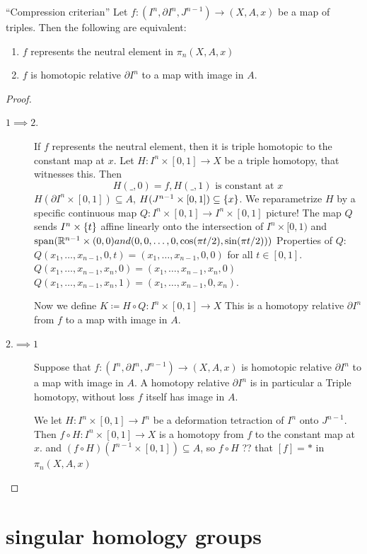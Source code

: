 \documentclass{TemplateLecture}
\begin{document}
\begin{proposition}
    \enquote{Compression criterian} Let \(f \colon (I^n, \partial I^n, J^{n-1}) \to (X,A,x)\) be a map of triples. Then the following are equivalent:
    \begin{enumerate}
        \item \(f\) represents the neutral element in \(\pi_n(X,A,x)\)
        \item \(f\) is homotopic relative \(\partial I^n\) to a map with image in \(A\).
    \end{enumerate}
\end{proposition}
\begin{proof}
    \begin{description}
        \item[\(1 \implies 2.\)]  If \(f\) represents the neutral element, then it is triple homotopic to the constant map at \(x\). Let \(H\colon I^n \times [0,1] \to X\) be a triple homotopy, that witnesses this. Then
        \[H(\_, 0) = f, H(\_, 1) \text{ is constant at }x\]
        \(H(\partial I^n \times [0,1]) \subseteq A\), \(H(J^{n-1}\times [0,1]) \subseteq \{x\}\). We reparametrize \(H\) by a specific continuous map \(Q\colon I^n \times [0,1] \to I^n \times [0,1]\) picture! The map \(Q\) sends \(I^n \times \{t\}\) affine linearly onto the intersection of \(I^n \times [0,1)\) and \(\mathrm{span}(\mathbb{R}^{n-1} \times {(0,0)} and (0,0,\dots, 0, \cos(\pi t/2), \sin(\pi t/2)))\)
        Properties of \(Q\):
        \(Q(x_1, \dots, x_{n-1},0,t) = (x_1, \dots , x_{n-1},0,0)\) for all \(t \in [0,1]\).
        \(Q(x_1, \dots, x_{n-1}, x_n, 0) = (x_1, \dots, x_{n-1}, x_n,0)\)
        \(Q(x_1, \dots, x_{n-1}, x_n, 1) = (x_1, \dots, x_{n-1}, 0, x_n)\).

        Now we define \(K \coloneq H \circ Q\colon I^n \times [0,1] \to X\) This is a homotopy relative \(\partial I^n\) from \(f\) to a map with image in \(A\).
        \item[\(2. \implies 1\)] Suppose that \(f \colon (I^n, \partial I^n, J^{n-1}) \to (X,A, x)\) is homotopic relative \(\partial I^n\) to a map with image in \(A\). A homotopy relative \(\partial I^n\) is in particular a Triple homotopy, without loss \(f\) itself has image in \(A\).
        
        We let \(H\colon I^n \times [0,1] \to I^n\) be a deformation tetraction of \(I^n\) onto \(J^{n-1}\). Then \(f\circ H\colon I^n \times [0,1] \to X\) is a homotopy from \(f\) to the constant map at \(x\). and \((f\circ H)(I^{n-1} \times [0,1]) \subseteq A\), so \(f\circ H\) ?? that \([f] = *\) in \(\pi_n(X,A,x)\) 
    \end{description}
\end{proof}


\section{singular homology groups}
\end{document}
